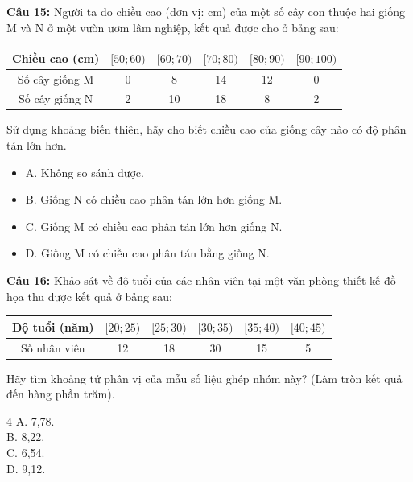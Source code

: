 \documentclass[12pt]{article}
\begin{document}
	\vspace{4mm}
	
	\noindent \textbf{Câu 15:} Người ta đo chiều cao (đơn vị: cm) của một số cây con thuộc hai giống M và N ở một vườn ươm lâm nghiệp, kết quả được cho ở bảng sau:
	\begin{center}
		\renewcommand{\arraystretch}{1.3}
		\begin{tabular}{|c|c|c|c|c|c|}
			\hline
			Chiều cao (cm) & $[50; 60)$ & $[60; 70)$ & $[70; 80)$ & $[80; 90)$ & $[90; 100)$ \\
			\hline
			Số cây giống M & 0 & 8 & 14 & 12 & 0 \\
			\hline
			Số cây giống N & 2 & 10 & 18 & 8 & 2 \\
			\hline
		\end{tabular}
	\end{center}
	Sử dụng khoảng biến thiên, hãy cho biết chiều cao của giống cây nào có độ phân tán lớn hơn.
	\begin{itemize}[label=, leftmargin=*]
		\item A. Không so sánh được.
		\item B. Giống N có chiều cao phân tán lớn hơn giống M.
		\item C. Giống M có chiều cao phân tán lớn hơn giống N.
		\item D. Giống M có chiều cao phân tán bằng giống N.
	\end{itemize}
	
	\noindent \textbf{Câu 16:} Khảo sát về độ tuổi của các nhân viên tại một văn phòng thiết kế đồ họa thu được kết quả ở bảng sau:
	\begin{center}
		\renewcommand{\arraystretch}{1.3}
		\begin{tabular}{|c|c|c|c|c|c|}
			\hline
			Độ tuổi (năm) & $[20; 25)$ & $[25; 30)$ & $[30; 35)$ & $[35; 40)$ & $[40; 45)$ \\
			\hline
			Số nhân viên & 12 & 18 & 30 & 15 & 5 \\
			\hline
		\end{tabular}
	\end{center}
	Hãy tìm khoảng tứ phân vị của mẫu số liệu ghép nhóm này? (Làm tròn kết quả đến hàng phần trăm).
	\begin{multicols}{4}
		A. 7,78. \\
		B. 8,22. \\
		C. 6,54. \\
		D. 9,12.
	\end{multicols}
	
	\vspace{4mm}
	
\end{document}
